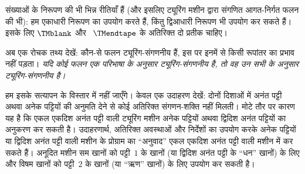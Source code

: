 \documentclass[../../../include/open-logic-section]{subfiles}
\begin{document}
संख्याओं के निरूपण की भी भिन्न रीतियाँ हैं (और इसलिए ट्यूरिंग मशीन द्वारा
संगणित आगत-निर्गत फलन की भी): हम एकाधारी निरूपण का उपयोग करते हैं, किंतु
द्विआधारी निरूपण भी उपयोग कर सकते हैं। इसके लिए $\TMblank$ और
~$\TMendtape$ के अतिरिक्त दो प्रतीक चाहिए।

अब एक रोचक तथ्य देखें: कौन-से फलन ट्यूरिंग-संगणनीय हैं, इस पर इनमें से
किसी रूपांतर का प्रभाव नहीं पड़ता। \emph{यदि कोई फलन एक परिभाषा के
अनुसार ट्यूरिंग-संगणनीय है, तो वह उन सभी के अनुसार ट्यूरिंग-संगणनीय है।}

हम इसके सत्यापन के विस्तार में नहीं जाएँगे। केवल एक उदाहरण देखें:
दोनों दिशाओं में अनंत पट्टी अथवा अनेक पट्टियों की अनुमति देने से कोई
अतिरिक्त संगणन-शक्ति नहीं मिलती। मोटे तौर पर कारण यह है कि एकल एकदिश
अनंत पट्टी वाली ट्यूरिंग मशीन अनेक पट्टियों अथवा द्विदिश अनंत पट्टियों
का अनुकरण कर सकती है। उदाहरणार्थ, अतिरिक्त अवस्थाओं और निर्देशों का
उपयोग करके अनेक पट्टियों या द्विदिश अनंत पट्टी वाली मशीन के प्रोग्राम का
``अनुवाद'' एकल एकदिश अनंत पट्टी वाली मशीन में कर सकते हैं। अनूदित मशीन
सम खानों को पट्टी~$1$ के खानों (या द्विदिश अनंत पट्टी के ``धन'' खानों)
के लिए और विषम खानों को पट्टी~$2$ के खानों (या ``ऋण'' खानों) के लिए
उपयोग कर सकती है।
\end{document}
